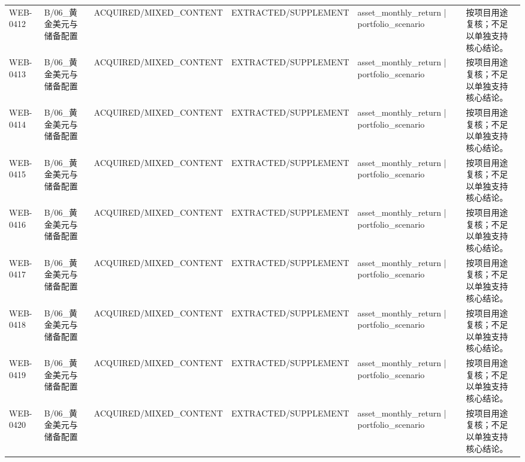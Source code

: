 \begin{landscape}
\begin{longtable}{p{1.8cm}p{2.6cm}p{2.6cm}p{2.6cm}p{4.8cm}p{7.2cm}}
WEB-0412 & B/\allowbreak{}06\_\allowbreak{}黄金美元与储备配置 & ACQUIRED/\allowbreak{}MIXED\_\allowbreak{}CONTENT & EXTRACTED/\allowbreak{}SUPPLEMENT & asset\_\allowbreak{}monthly\_\allowbreak{}return | portfolio\_\allowbreak{}scenario & 按项目用途复核；不足以单独支持核心结论。\\
WEB-0413 & B/\allowbreak{}06\_\allowbreak{}黄金美元与储备配置 & ACQUIRED/\allowbreak{}MIXED\_\allowbreak{}CONTENT & EXTRACTED/\allowbreak{}SUPPLEMENT & asset\_\allowbreak{}monthly\_\allowbreak{}return | portfolio\_\allowbreak{}scenario & 按项目用途复核；不足以单独支持核心结论。\\
WEB-0414 & B/\allowbreak{}06\_\allowbreak{}黄金美元与储备配置 & ACQUIRED/\allowbreak{}MIXED\_\allowbreak{}CONTENT & EXTRACTED/\allowbreak{}SUPPLEMENT & asset\_\allowbreak{}monthly\_\allowbreak{}return | portfolio\_\allowbreak{}scenario & 按项目用途复核；不足以单独支持核心结论。\\
WEB-0415 & B/\allowbreak{}06\_\allowbreak{}黄金美元与储备配置 & ACQUIRED/\allowbreak{}MIXED\_\allowbreak{}CONTENT & EXTRACTED/\allowbreak{}SUPPLEMENT & asset\_\allowbreak{}monthly\_\allowbreak{}return | portfolio\_\allowbreak{}scenario & 按项目用途复核；不足以单独支持核心结论。\\
WEB-0416 & B/\allowbreak{}06\_\allowbreak{}黄金美元与储备配置 & ACQUIRED/\allowbreak{}MIXED\_\allowbreak{}CONTENT & EXTRACTED/\allowbreak{}SUPPLEMENT & asset\_\allowbreak{}monthly\_\allowbreak{}return | portfolio\_\allowbreak{}scenario & 按项目用途复核；不足以单独支持核心结论。\\
WEB-0417 & B/\allowbreak{}06\_\allowbreak{}黄金美元与储备配置 & ACQUIRED/\allowbreak{}MIXED\_\allowbreak{}CONTENT & EXTRACTED/\allowbreak{}SUPPLEMENT & asset\_\allowbreak{}monthly\_\allowbreak{}return | portfolio\_\allowbreak{}scenario & 按项目用途复核；不足以单独支持核心结论。\\
WEB-0418 & B/\allowbreak{}06\_\allowbreak{}黄金美元与储备配置 & ACQUIRED/\allowbreak{}MIXED\_\allowbreak{}CONTENT & EXTRACTED/\allowbreak{}SUPPLEMENT & asset\_\allowbreak{}monthly\_\allowbreak{}return | portfolio\_\allowbreak{}scenario & 按项目用途复核；不足以单独支持核心结论。\\
WEB-0419 & B/\allowbreak{}06\_\allowbreak{}黄金美元与储备配置 & ACQUIRED/\allowbreak{}MIXED\_\allowbreak{}CONTENT & EXTRACTED/\allowbreak{}SUPPLEMENT & asset\_\allowbreak{}monthly\_\allowbreak{}return | portfolio\_\allowbreak{}scenario & 按项目用途复核；不足以单独支持核心结论。\\
WEB-0420 & B/\allowbreak{}06\_\allowbreak{}黄金美元与储备配置 & ACQUIRED/\allowbreak{}MIXED\_\allowbreak{}CONTENT & EXTRACTED/\allowbreak{}SUPPLEMENT & asset\_\allowbreak{}monthly\_\allowbreak{}return | portfolio\_\allowbreak{}scenario & 按项目用途复核；不足以单独支持核心结论。\\

\end{longtable}
\end{landscape}

